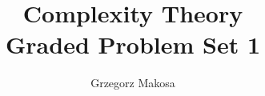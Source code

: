 \documentclass[10pt,a4paper,article,oneside]{memoir}
\begin{document}
\title{Complexity Theory \\ Graded Problem Set 1}
\author{Grzegorz Makosa}
\maketitle

\setcounter {myc}{1}

\end{document}
